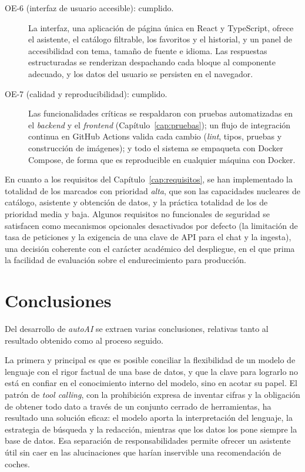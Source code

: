\begin{description}
  \item[OE-6 (interfaz de usuario accesible): cumplido.] La interfaz, una
        aplicación de página única en React y TypeScript, ofrece el asistente, el
        catálogo filtrable, los favoritos y el historial, y un panel de
        accesibilidad con tema, tamaño de fuente e idioma. Las respuestas
        estructuradas se renderizan despachando cada bloque al componente adecuado,
        y los datos del usuario se persisten en el navegador.

  \item[OE-7 (calidad y reproducibilidad): cumplido.] Las funcionalidades críticas
        se respaldaron con pruebas automatizadas en el \emph{backend} y el
        \emph{frontend} (Capítulo~\ref{cap:pruebas}); un flujo de integración
        continua en GitHub Actions valida cada cambio (\emph{lint}, tipos, pruebas y
        construcción de imágenes); y todo el sistema se empaqueta con Docker
        Compose, de forma que es reproducible en cualquier máquina con Docker.
\end{description}

En cuanto a los requisitos del Capítulo~\ref{cap:requisitos}, se han implementado
la totalidad de los marcados con prioridad \emph{alta}, que son las capacidades
nucleares de catálogo, asistente y obtención de datos, y la práctica totalidad de
los de prioridad media y baja. Algunos requisitos no funcionales de seguridad se
satisfacen como mecanismos opcionales desactivados por defecto (la limitación de
tasa de peticiones y la exigencia de una clave de API para el chat y la ingesta),
una decisión coherente con el carácter académico del despliegue, en el que prima
la facilidad de evaluación sobre el endurecimiento para producción.

\section{Conclusiones}
\label{sec:concl-conclusiones}

Del desarrollo de \emph{autoAI} se extraen varias conclusiones, relativas tanto al
resultado obtenido como al proceso seguido.

La primera y principal es que es posible conciliar la flexibilidad de un modelo de
lenguaje con el rigor factual de una base de datos, y que la clave para lograrlo no
está en confiar en el conocimiento interno del modelo, sino en acotar su papel. El
patrón de \emph{tool calling}, con la prohibición expresa de inventar cifras y la
obligación de obtener todo dato a través de un conjunto cerrado de herramientas, ha
resultado una solución eficaz: el modelo aporta la interpretación del lenguaje, la
estrategia de búsqueda y la redacción, mientras que los datos los pone siempre la
base de datos. Esa separación de responsabilidades permite ofrecer un asistente
útil sin caer en las alucinaciones que harían inservible una recomendación de
coches.

